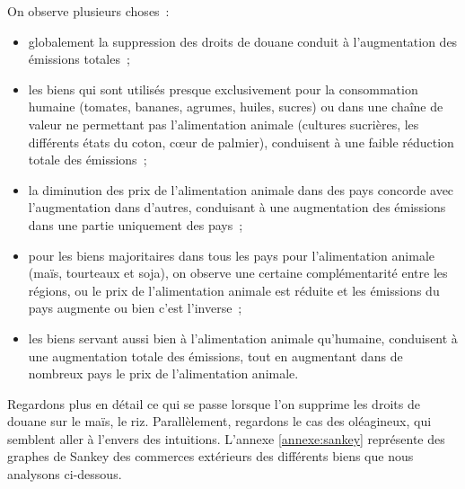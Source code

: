 On observe plusieurs choses~:
\begin{itemize}
    \item globalement la suppression des droits de douane conduit à l'augmentation des émissions totales~;
    \item les biens qui sont utilisés presque exclusivement pour la consommation humaine (tomates, bananes, agrumes, huiles, sucres) ou dans une chaîne de valeur ne permettant pas l'alimentation animale (cultures sucrières, les différents états du coton, cœur de palmier), conduisent à une faible réduction totale des émissions~;
    \item la diminution des prix de l'alimentation animale dans des pays concorde avec l'augmentation dans d'autres, conduisant à une augmentation des émissions dans une partie uniquement des pays~;
    \item pour les biens majoritaires dans tous les pays pour l'alimentation animale (maïs, tourteaux et soja), on observe une certaine complémentarité entre les régions, ou le prix de l'alimentation animale est réduite et les émissions du pays augmente ou bien c'est l'inverse~;
    \item les biens servant aussi bien à l'alimentation animale qu'humaine, conduisent à une augmentation totale des émissions, tout en augmentant dans de nombreux pays le prix de l'alimentation animale.
\end{itemize}

Regardons plus en détail ce qui se passe lorsque l'on supprime les droits de douane sur le maïs, le riz. Parallèlement, regardons le cas des oléagineux, qui semblent aller à l'envers des intuitions. L'annexe \ref{annexe:sankey} représente des graphes de Sankey des commerces extérieurs des différents biens que nous analysons ci-dessous.

